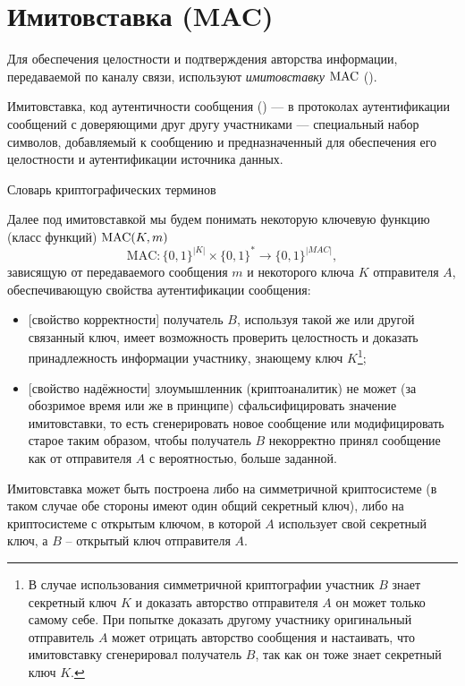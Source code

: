 \section{Имитовставка (MAC)}\label{section-MAC}

Для обеспечения целостности и подтверждения авторства информации, передаваемой по каналу связи, используют \emph{имитовставку} $\textrm{MAC}$ ().

\begin{displayquote}\begin{sloppypar}
Имитовставка, код аутентичности сообщения () —  в  протоколах аутентификации сообщений с доверяющими друг другу участниками — специальный набор символов, добавляемый к сообщению и предназначенный для обеспечения его целостности и аутентификации источника данных.
\begin{flushright}Словарь криптографических терминов~\cite{Pogorelov:Sachkov:2006}
\end{flushright}
\end{sloppypar}\end{displayquote}

Далее под имитовставкой мы будем понимать некоторую ключевую функцию (класс функций) $\textrm{MAC}(K,m)$\[
    \textrm{MAC}: \{0,1\}^{|K|} \times \{0,1\}^* \to \{0,1\}^{|MAC|},
\] зависящую от передаваемого сообщения $m$ и некоторого ключа $K$ отправителя $A$, обеспечивающую свойства аутентификации сообщения:
\begin{itemize}
    \item {[}свойство корректности{]} получатель $B$, используя такой же или другой связанный ключ, имеет возможность проверить целостность и доказать принадлежность информации участнику, знающему ключ $K$\footnote{В случае использования симметричной криптографии участник $B$ знает секретный ключ $K$ и доказать авторство отправителя $A$ он может только самому себе. При попытке доказать другому участнику оригинальный отправитель $A$ может отрицать авторство сообщения и настаивать, что имитовставку сгенерировал получатель $B$, так как он тоже знает секретный ключ $K$.};
    \item {[}свойство надёжности{]} злоумышленник (криптоаналитик) не может (за обозримое время или же в принципе) сфальсифицировать значение имитовставки, то есть сгенерировать новое сообщение или модифицировать старое таким образом, чтобы получатель $B$ некорректно принял сообщение как от отправителя $A$ с вероятностью, больше заданной.
\end{itemize}

Имитовставка может быть построена либо на симметричной криптосистеме (в таком случае обе стороны имеют один общий секретный ключ), либо на криптосистеме с открытым ключом, в которой $A$ использует свой секретный ключ, а $B$ -- открытый ключ отправителя $A$.











